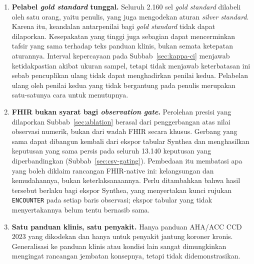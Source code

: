 \begin{enumerate}
    benar-benar tidak bergantung mencakup 53 rekomendasi dan mencatat presisi $0{,}666$ serta
    $F_1$ $0{,}797$, berbanding $0{,}685$ dan $0{,}811$ pada angka utama
    (Subbab~\ref{sec:shared-predicate}). Seluruh perolehan ablasi terukur pada kelima belas
    rekomendasi berpredikat bersama tersebut sehingga yang diukurnya adalah kesetiaan
    implementasi, bukan keabsahan klinis. Telaah klinisi hanya menguji aturan itu pada tiga
    dari kelima belas rekomendasi, yaitu \texttt{WM:2}, \texttt{WM:3}, dan \texttt{SGLT2:4}.
    Seluruh 50 penilaian penilai~A dan penilai~B atas ketiganya ``Tepat''
    (Subbab~\ref{sec:clinician}).
    \item \textbf{Pelabel \emph{gold standard} tunggal.} Seluruh 2.160 sel \emph{gold
    standard} dilabeli oleh satu orang, yaitu penulis, yang juga mengodekan aturan
    \emph{silver standard}. Karena itu, keandalan antarpenilai bagi \emph{gold standard} tidak
    dapat dilaporkan. Kesepakatan yang tinggi juga sebagian dapat mencerminkan tafsir yang sama
    terhadap teks panduan klinis, bukan semata ketepatan aturannya. Interval kepercayaan pada
    Subbab~\ref{sec:kappa-ci} menjawab ketidakpastian akibat ukuran sampel, tetapi tidak menjawab
    keterbatasan ini sebab pencuplikan ulang tidak dapat menghadirkan penilai kedua.
    Pelabelan ulang oleh penilai kedua yang tidak bergantung pada penulis merupakan
    satu-satunya cara untuk menutupnya.
    \item \textbf{FHIR bukan syarat bagi \emph{observation gate}.} Perolehan presisi yang
    dilaporkan Subbab~\ref{sec:ablation} berasal dari penggerbangan atas nilai observasi
    numerik, bukan dari wadah FHIR secara khusus. Gerbang yang sama dapat dibangun kembali dari
    ekspor tabular Synthea dan menghasilkan keputusan yang sama persis pada seluruh 13.140
    keputusan yang diperbandingkan (Subbab~\ref{sec:csv-gating}). Pembedaan itu membatasi apa
    yang boleh diklaim rancangan FHIR-native ini: kelangsungan dan kemudahannya, bukan
    keterlaksanaannya. Perlu ditambahkan bahwa hasil tersebut berlaku bagi ekspor Synthea, yang
    menyertakan kunci rujukan \texttt{ENCOUNTER} pada setiap baris observasi; ekspor tabular
    yang tidak menyertakannya belum tentu bernasib sama.
    \item \textbf{Satu panduan klinis, satu penyakit.} Hanya panduan AHA/ACC CCD 2023 yang dikodekan
    dan hanya untuk penyakit jantung koroner kronis. Generalisasi ke panduan klinis atau kondisi lain
    sangat dimungkinkan mengingat rancangan jembatan konsepnya, tetapi tidak didemonstrasikan.

\end{enumerate}
